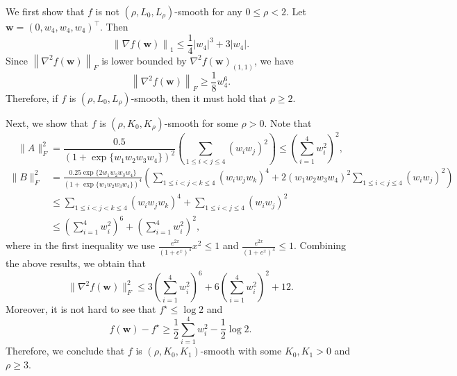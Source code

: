 \documentclass{article}
\newcommand{\Norm}[1]{\left\|#1\right\|}
\newcommand{\paren}[1]{\left( #1 \right)}
\newcommand{\bw}{\mathbf{w}}
\begin{document}
We first show that $f$ is not $(\rho,L_0,L_\rho)$-smooth for any $0\leq\rho<2$. Let $\bw=\paren{0,w_4,w_4,w_4}^\top$. Then 
$$\Norm{\nabla f(\bw)}_1\leq \frac{1}{4}|w_4|^3+3|w_4|.$$
Since $\Norm{\nabla^2 f(\bw)}_F$ is lower bounded by $\nabla^2 f(\bw)_{(1,1)}$, we have
$$\Norm{\nabla^2 f(\bw)}_F\geq \frac{1}{8}w_4^6.$$
Therefore, if $f$ is $(\rho,L_0,L_\rho)$-smooth, then it must hold that $\rho\geq 2$.

Next, we show that $f$ is $(\rho,K_0,K_\rho)$-smooth for some $\rho>0$. Note that 
$$\|A\|_F^2= \frac{0.5}{\left(1+\exp\{w_1w_2w_3w_4\}\right)^2}\left(\sum_{1\leq i<j\leq 4}\left(w_iw_j\right)^2\right)\leq \left(\sum_{i=1}^4 w_i^2\right)^2,$$
\begin{equation}\nonumber
    \begin{aligned}
        \|B\|_F^2&=\frac{0.25\exp\{2w_1w_2w_3w_4\}}{\left(1+\exp\{w_1w_2w_3w_4\}\right)^4}\left(\sum_{1\leq i<j<k\leq 4}\left(w_iw_jw_k\right)^4+2\left(w_1w_2w_3w_4 \right)^2\sum_{1\leq i< j\leq 4}\left(w_iw_j\right)^2\right)\\
        &\leq \sum_{1\leq i<j<k\leq 4}\left(w_iw_jw_k\right)^4+\sum_{1\leq i< j\leq 4}\left(w_iw_j\right)^2\\
        &\leq \left(\sum_{i=1}^4 w_i^2\right)^6+\left(\sum_{i=1}^4 w_i^2\right)^2,
    \end{aligned}    
\end{equation}
where in the first inequality we use $\frac{e^{2x}}{(1+e^x)^4}x^2\leq 1$ and $\frac{e^{2x}}{(1+e^x)^4}\leq 1$. Combining the above results, we obtain that
$$\|\nabla^2 f(\bw)\|^2_F\leq 3\left(\sum_{i=1}^4 w_i^2\right)^6+6\left(\sum_{i=1}^4 w_i^2\right)^2+12.$$
Moreover, it is not hard to see that $f^\star\leq \log 2$ and 
$$f(\bw)-f^\star\geq \frac{1}{2}\sum_{i=1}^4 w_i^2-\frac{1}{2}\log 2.$$
Therefore, we conclude that $f$ is $(\rho,K_0,K_1)$-smooth with some $K_0,K_1>0$ and $\rho\geq 3$.
\end{document}
